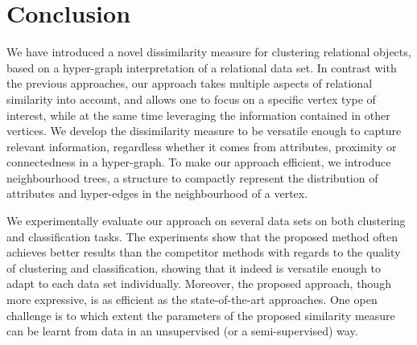 \section{Conclusion}

We have introduced a novel dissimilarity measure for clustering relational objects, based on a hyper-graph interpretation of a relational data set.
In contrast with the previous approaches, our approach takes multiple aspects of relational similarity into account, and  allows one to focus on a specific vertex type of interest, while at the same time leveraging the information contained in other vertices.
We develop the dissimilarity measure to be versatile enough to capture relevant information, regardless whether it comes from attributes, proximity or connectedness in a hyper-graph.
To make our approach efficient, we introduce neighbourhood trees, a structure to compactly represent the distribution of attributes and hyper-edges in the neighbourhood of a vertex.


We experimentally evaluate our approach on several data sets on both clustering and classification tasks.
The experiments show that the proposed method often achieves better results than the competitor methods with regards to the quality of clustering and classification, showing that it indeed is versatile enough to adapt to each data set individually.
Moreover, the proposed approach, though more expressive, is as efficient as the state-of-the-art approaches.
One open challenge is to which extent the parameters of the proposed similarity measure can be learnt from data in an unsupervised (or a semi-supervised) way.







\cleardoublepage


